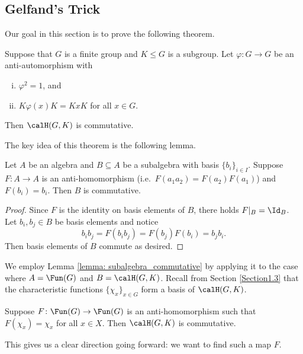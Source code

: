\subsection{Gelfand's Trick}\label{Section1.7}
Our goal in this section is to prove the following theorem.
\begin{thm} \label{theorem: Gelfand's_Trick}
    Suppose that $G$ is a finite group and $K\leq G$ is a subgroup.
    Let $\varphi\colon G\to G$ be an anti-automorphism with
    \begin{enumerate}[(i)]
        \item $\varphi^2=1$, and
        \item $K\varphi(x)K=KxK$ for all $x\in G$.
    \end{enumerate}
    Then $\calH(G,K)$ is commutative.
\end{thm}
The key idea of this theorem is the following lemma.
\begin{lem}\label{lemma: subalgebra_commutative}
    Let $A$ be an algebra and $B\subseteq A$ be a subalgebra with basis $\{b_i\}_{i\in I}$.
    Suppose $F\colon A\to A$ is an anti-homomorphism (i.e.\ $F(a_1a_2)=F(a_2)F(a_1)$) and $F(b_i) = b_i$.
    Then $B$ is commutative.
\end{lem}
\begin{proof}
    Since $F$ is the identity on basis elements of $B$, there holds $F|_B = \Id_B$.
    Let $b_i,b_j\in B$ be basis elements and notice
    \[
        b_ib_j = F(b_ib_j) = F(b_j)F(b_i) = b_jb_i.
    \]
    Then basis elements of $B$ commute as desired.
\end{proof}
We employ Lemma \ref{lemma: subalgebra_commutative} by applying it to the case where $A=\Fun(G)$ and $B=\calH(G,K)$. Recall from Section \ref{Section1.3} that the characteristic functions $\{\chi_x\}_{x\in G}$ form a basis of $\calH(G,K)$.
\begin{cor}\label{cor: comm}
    Suppose $F\colon \Fun(G) \to \Fun(G)$ is an anti-homomorphism such that $F(\chi_x) = \chi_x$ for all $x\in X$.
    Then $\calH(G,K)$ is commutative.
\end{cor}
This gives us a clear direction going forward: we want to find such a map $F$.

